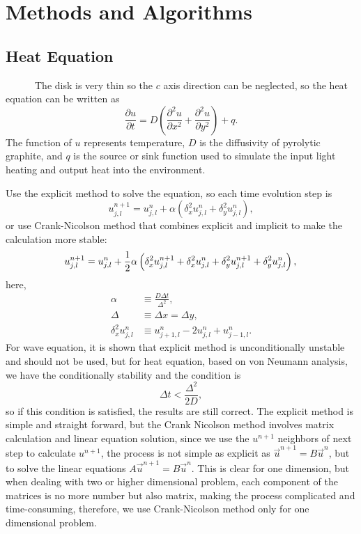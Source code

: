 \documentclass[a4paper,11pt]{article}
\theoremstyle{mytheor}
\begin{document}
\section{Methods and Algorithms}
\subsection*{Heat Equation}

\ \ \ \ \ \ The disk is very thin so the $c$ axis direction can be neglected, so the heat equation can be written as
\begin{equation}
\frac{\partial u}{\partial t} = D \left( \frac{\partial^2u}{\partial x^2} + \frac{\partial^2u}{\partial y^2} \right) + q.
\end{equation}
The function of $u$ represents temperature, $D$ is the diffusivity of pyrolytic graphite, and $q$ is the source or sink function used to simulate the input light heating and output heat into the environment. 

Use the explicit method to solve the equation, so each time evolution step is
\begin{equation}
u_{j,l}^{n+1} = u_{j,l}^n + \alpha \left( \delta_x^2 u_{j,l}^n + \delta_y^2 u_{j,l}^n \right),
\end{equation}
or use Crank-Nicolson method that combines explicit and implicit to make the calculation more stable:
\begin{equation}
u_{j,l}^{n+1} = u_{j,l}^n + \frac{1}{2}\alpha \left( \delta_x^2 u_{j,l}^{n+1} + \delta_x^2 u_{j,l}^n + \delta_y^2 u_{j,l}^{n+1} + \delta_y^2 u_{j,l}^n \right),\\
\end{equation}
here,
\begin{align}
\alpha &\equiv \frac{D \Delta t}{\Delta^2},\\
\Delta &\equiv \Delta x = \Delta y,\\
\delta_x^2 u_{j,l}^n &\equiv u_{j+1,l}^n - 2u_{j,l}^n + u_{j-1,l}^n.
\end{align}
For wave equation, it is shown that explicit method is unconditionally unstable and should not be used, but for heat equation, based on von Neumann analysis, we have the conditionally stability and the condition is 
\begin{equation}
\Delta t < \frac{\Delta^2}{2D},
\end{equation}
so if this condition is satisfied, the results are still correct. The explicit method is simple and straight forward, but the Crank Nicolson method involves matrix calculation and linear equation solution, since we use the $u^{n+1}$ neighbors of next step to calculate $u^{n+1}$, the process is not simple as explicit as $\vec u^{n+1} = B\vec u^{n}$, but to solve the linear equations $A\vec u^{n+1} = B\vec u^{n}$. This is clear for one dimension, but when dealing with two or higher dimensional problem, each component of the matrices is no more number but also matrix, making the process complicated and time-consuming, therefore, we use Crank-Nicolson method only for one dimensional problem.
\end{document}
